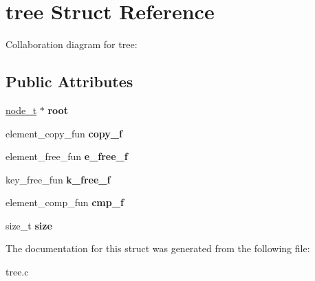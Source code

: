 \hypertarget{structtree}{}\section{tree Struct Reference}
\label{structtree}


Collaboration diagram for tree\+:
\subsection*{Public Attributes}
\begin{DoxyCompactItemize}
\item 
\hyperlink{structnode}{node\+\_\+t} $\ast$ {\bfseries root}\hypertarget{structtree_a1c9d515ea8291ba3e8dd27a32ad11c99}{}\label{structtree_a1c9d515ea8291ba3e8dd27a32ad11c99}

\item 
element\+\_\+copy\+\_\+fun {\bfseries copy\+\_\+f}\hypertarget{structtree_a612e416ae22a51e05773a4ed5a673a95}{}\label{structtree_a612e416ae22a51e05773a4ed5a673a95}

\item 
element\+\_\+free\+\_\+fun {\bfseries e\+\_\+free\+\_\+f}\hypertarget{structtree_a52ca9019231724325da51c920ba98b83}{}\label{structtree_a52ca9019231724325da51c920ba98b83}

\item 
key\+\_\+free\+\_\+fun {\bfseries k\+\_\+free\+\_\+f}\hypertarget{structtree_a2a6ff28f2b42cea10f416f6e0fd4f540}{}\label{structtree_a2a6ff28f2b42cea10f416f6e0fd4f540}

\item 
element\+\_\+comp\+\_\+fun {\bfseries cmp\+\_\+f}\hypertarget{structtree_a4bbea9002bc047957acc4672113cac7c}{}\label{structtree_a4bbea9002bc047957acc4672113cac7c}

\item 
size\+\_\+t {\bfseries size}\hypertarget{structtree_a794fa86f6b2815f255a79b3a46fdb190}{}\label{structtree_a794fa86f6b2815f255a79b3a46fdb190}

\end{DoxyCompactItemize}


The documentation for this struct was generated from the following file\+:\begin{DoxyCompactItemize}
\item 
tree.\+c\end{DoxyCompactItemize}
